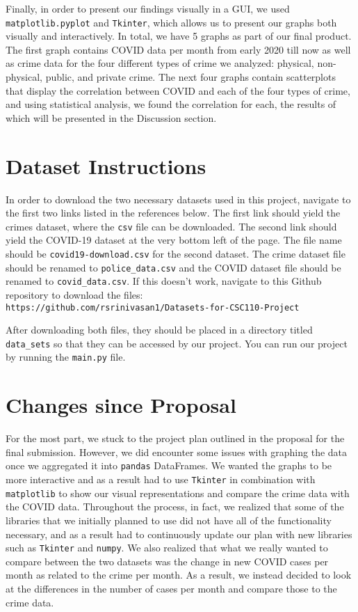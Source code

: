 \documentclass[fontsize=11pt]{article}
\begin{document}
Finally, in order to present our findings visually in a GUI, we used \verb+matplotlib.pyplot+ and \verb+Tkinter+, which allows us to present our graphs both visually and interactively. In total, we have 5 graphs as part of our final product. The first graph contains COVID data per month from early 2020 till now as well as crime data for the four different types of crime we analyzed: physical, non-physical, public, and private crime. The next four graphs contain scatterplots that display the correlation between COVID and each of the four types of crime, and using statistical analysis, we found the correlation for each, the results of which will be presented in the Discussion section.

\section{Dataset Instructions}

In order to download the two necessary datasets used in this project, navigate to the first two links listed in the references below. The first link should yield the crimes dataset, where the \verb+csv+ file can be downloaded. The second link should yield the COVID-19 dataset at the very bottom left of the page. The file name should be \verb+covid19-download.csv+ for the second dataset. The crime dataset file should be renamed to \verb+police_data.csv+ and the COVID dataset file should be renamed to \verb+covid_data.csv+. If this doesn’t work, navigate to this Github repository to download the files:\\ \verb+https://github.com/rsrinivasan1/Datasets-for-CSC110-Project+

After downloading both files, they should be placed in a directory titled \verb+data_sets+ so that they can be accessed by our project. You can run our project by running the \verb+main.py+ file.

\section{Changes since Proposal}
For the most part, we stuck to the project plan outlined in the proposal for the final submission. However, we did encounter some issues with graphing the data once we aggregated it into \verb+pandas+ DataFrames. We wanted the graphs to be more interactive and as a result had to use \verb+Tkinter+ in combination with \verb+matplotlib+ to show our visual representations and compare the crime data with the COVID data. Throughout the process, in fact, we realized that some of the libraries that we initially planned to use did not have all of the functionality necessary, and as a result had to continuously update our plan with new libraries such as \verb+Tkinter+ and \verb+numpy+. We also realized that what we really wanted to compare between the two datasets was the change in new COVID cases per month as related to the crime per month. As a result, we instead decided to look at the differences in the number of cases per month and compare those to the crime data.
\end{document}
